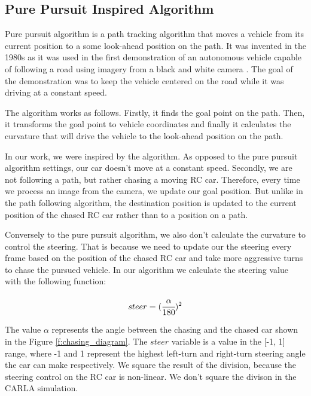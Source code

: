\subsection{Pure Pursuit Inspired Algorithm}
Pure pursuit algorithm is a path tracking algorithm that moves a vehicle from its current position to a some look-ahead position on the path. It was invented in the 1980s as it was used in the first demonstration of an autonomous vehicle capable of following a road using imagery from a black and white camera \cite{pure_pursuit_orig}. The goal of the demonstration was to keep the vehicle centered on the road while it was driving at a constant speed.\par
The algorithm works as follows. Firstly, it finds the goal point on the path. Then, it transforms the goal point to vehicle coordinates and finally it calculates the curvature that will drive the vehicle to the look-ahead position on the path. \par
In our work, we were inspired by the algorithm. As opposed to the pure pursuit algorithm settings, our car doesn't move at a constant speed. Secondly, we are not following a path, but rather chasing a moving RC car. Therefore, every time we process an image from the camera, we update our goal position. But unlike in the path following algorithm, the destination position is updated to the current position of the chased RC car rather than to a position on a path. \par
Conversely to the pure pursuit algorithm, we also don't calculate the curvature to control the steering. That is because we need to update our the steering every frame based on the position of the chased RC car and take more aggressive turns to chase the pursued vehicle. In our algorithm we calculate the steering value with the following function:

\begin{equation}steer = (\cfrac{\alpha}{\textrm{180}})^{2}\end{equation}

The value $\alpha$ represents the angle between the chasing and the chased car shown in the Figure \ref{f:chasing_diagram}. The $steer$ variable is a value in the [-1, 1] range, where -1 and 1 represent the highest left-turn and right-turn steering angle the car can make respectively. We square the result of the division, because the steering control on the RC car is non-linear. We don't square the divison in the CARLA simulation.

